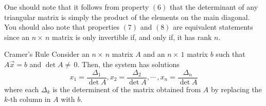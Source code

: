 One should note that it follows from property $(6)$ that the determinant of any triangular matrix is simply the product of the elements on the main diagonal. You should also note that properties $(7)$ and $(8)$ are equivalent statements since an $n\times\,n$ matrix is only invertible if, and only if, it has rank $n$.

\begin{defbox}{Cramer's Rule}{}
    Consider an $n\times\,n$ matrix $A$ and an $n\times\,1$ matrix $b$ such that $A\vec{x}=b$ and $\det{A}\neq\,0$. Then, the system has solutions
    \[x_1 = \frac{\Delta_1}{\det{A}}, x_2 = \frac{\Delta_2}{\det{A}}, \cdots\,, x_n = \frac{\Delta_n}{\det{A}}\]
    where each $\Delta_k$ is the determinent of the matrix obtained from $A$ by replacing the $k$-th column in $A$ with $b$.
\end{defbox}


